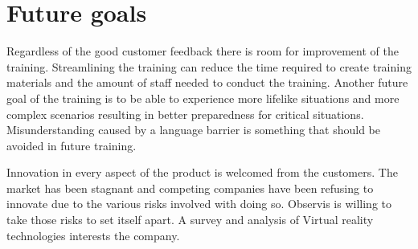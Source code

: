 \documentclass[12pt, a4paper,oneside, nocenter]{thesis}
\begin{document}
\section{Future goals}
Regardless of the good customer feedback there is room for improvement of the training. Streamlining the training can reduce the time required to create training materials and the amount of staff needed to conduct the training. Another future goal of the training is to be able to experience more lifelike situations and more complex scenarios resulting in better preparedness for critical situations. Misunderstanding caused by a language barrier is something that should be avoided in future training.
\par
Innovation in every aspect of the product is welcomed from the customers. The market has been stagnant and competing companies have been refusing to innovate due to the various risks involved with doing so. Observis is willing to take those risks to set itself apart. A survey and analysis of Virtual reality technologies interests the company.
\par
\end{document}
